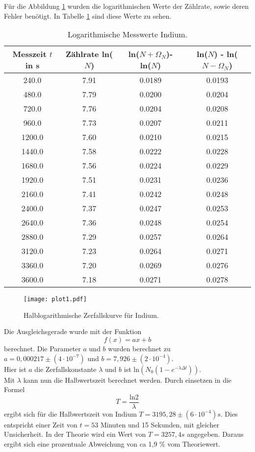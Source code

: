 Für die Abbildung \ref{fig:plot1} wurden die logarithmischen Werte der Zählrate, sowie deren Fehler benötigt.
In Tabelle \ref{tab:lnN1} sind diese Werte zu sehen.

\begin{table}
  \centering
  \caption{Logarithmische Messwerte Indium.}
  \label{tab:lnN1}
\begin{tabular}{c c c c}
  \toprule
  Messzeit $t$ in s & Zählrate ln($N$) & ln($N + \Omega_N$)- ln($N$) & ln($N$) - ln($N - \Omega_N$)\\
  \midrule
  240.0 & 7.91 & 0.0189 & 0.0193 \\
  480.0 & 7.79 & 0.0200 & 0.0204 \\
  720.0 & 7.76 & 0.0204 & 0.0208 \\
  960.0 & 7.73 & 0.0207 & 0.0211 \\
  1200.0 & 7.60 & 0.0210 & 0.0215 \\
  1440.0 & 7.58 & 0.0222 & 0.0228 \\
  1680.0 & 7.56 & 0.0224 & 0.0229 \\
  1920.0 & 7.51 & 0.0231 & 0.0236 \\
  2160.0 & 7.41 & 0.0242 & 0.0248 \\
  2400.0 & 7.37 & 0.0247 & 0.0253 \\
  2640.0 & 7.36 & 0.0248 & 0.0254 \\
  2880.0 & 7.29 & 0.0257 & 0.0264 \\
  3120.0 & 7.23 & 0.0264 & 0.0271 \\
  3360.0 & 7.20 & 0.0269 & 0.0276 \\
  3600.0 & 7.18 & 0.0271 & 0.0278 \\
  \bottomrule
\end{tabular}
\end{table}
\FloatBarrier

\begin{figure}
  \centering
  \texttt{[image: plot1.pdf]}
  \caption{Halblogarithmische Zerfallskurve für Indium.}
  \label{fig:plot1}
\end{figure}
\FloatBarrier

Die Ausgleichsgerade wurde mit der Funktion
\begin{equation}
  f(x) = ax +b
  \label{eqn:glFit}
\end{equation}
berechnet.
Die Parameter $a$ und $b$ wurden berechnet zu $a = 0,000217 \pm (4 \cdot 10^{-7})$ und $b = 7,926 \pm (2 \cdot 10^{-4})$. \\
Hier ist $a$ die Zerfallskonstante $\lambda$ und $b$ ist $\text{ln}(N_0(1-e^{-\lambda \Delta t}))$. \\
Mit $\lambda$ kann nun die Halbwertszeit berechnet werden.
Durch einsetzen in die Formel 
\begin{equation}
  T = \frac{\text{ln}2}{\lambda}
  \label{eqn:glTot}
\end{equation}
ergibt sich für die Halbwertszeit von Indium $T = 3195,28 \pm (6 \cdot 10^{-4}) s$.
Dies entspricht einer Zeit von $t = 53$ Minuten und 15 Sekunden, mit gleicher Unsicherheit.
In der Theorie wird ein Wert von $T = 3257,4 s$ \cite{Periode} angegeben.
Daraus ergibt sich eine prozentuale Abweichung von ca 1,9 \% vom Theoriewert.

